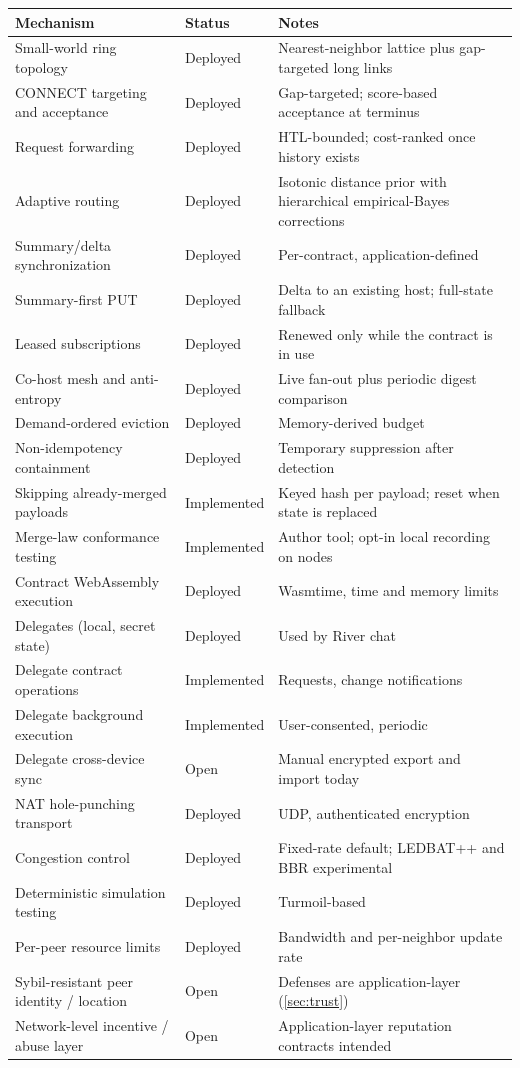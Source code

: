 \begin{center}
\small
\begin{tabular}{p{}p{}p{}}
\toprule
Mechanism & Status & Notes \\
\midrule
Small-world ring topology & Deployed & Nearest-neighbor lattice plus gap-targeted long links \\
\textsf{CONNECT} targeting and acceptance & Deployed & Gap-targeted; score-based acceptance at terminus \\
Request forwarding & Deployed & HTL-bounded; cost-ranked once history exists \\
Adaptive routing & Deployed & Isotonic distance prior with hierarchical empirical-Bayes corrections \\
Summary/delta synchronization & Deployed & Per-contract, application-defined \\
Summary-first \textsf{PUT} & Deployed & Delta to an existing host; full-state fallback \\
Leased subscriptions & Deployed & Renewed only while the contract is in use \\
Co-host mesh and anti-entropy & Deployed & Live fan-out plus periodic digest comparison \\
Demand-ordered eviction & Deployed & Memory-derived budget \\
Non-idempotency containment & Deployed & Temporary suppression after detection \\
Skipping already-merged payloads & Implemented & Keyed hash per payload; reset when state is replaced \\
Merge-law conformance testing & Implemented & Author tool; opt-in local recording on nodes \\
Contract WebAssembly execution & Deployed & Wasmtime, time and memory limits \\
Delegates (local, secret state) & Deployed & Used by River chat \citep{river} \\
Delegate contract operations & Implemented & Requests, change notifications \\
Delegate background execution & Implemented & User-consented, periodic \\
Delegate cross-device sync & Open & Manual encrypted export and import today \\
NAT hole-punching transport & Deployed & UDP, authenticated encryption \\
Congestion control & Deployed & Fixed-rate default; LEDBAT++ and BBR experimental \\
Deterministic simulation testing & Deployed & Turmoil-based \citep{turmoil} \\
Per-peer resource limits & Deployed & Bandwidth and per-neighbor update rate \\
Sybil-resistant peer identity / location & Open & Defenses are application-layer (\cref{sec:trust}) \\
Network-level incentive / abuse layer & Open & Application-layer reputation contracts intended \\
\bottomrule
\end{tabular}
\end{center}

